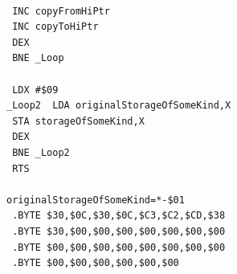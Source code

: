 \begin{minipage}[b]{0.33\linewidth}
\begin{lrbox}{\mybox}%
\begin{lstlisting}[basicstyle=\ttfamily\tiny]

 INC copyFromHiPtr
 INC copyToHiPtr
 DEX
 BNE _Loop

 LDX #$09
_Loop2  LDA originalStorageOfSomeKind,X
 STA storageOfSomeKind,X
 DEX
 BNE _Loop2
 RTS

originalStorageOfSomeKind=*-$01
 .BYTE $30,$0C,$30,$0C,$C3,$C2,$CD,$38
 .BYTE $30,$00,$00,$00,$00,$00,$00,$00
 .BYTE $00,$00,$00,$00,$00,$00,$00,$00
 .BYTE $00,$00,$00,$00,$00,$00

\end{lstlisting}
\end{lrbox}%
\scalebox{0.8}{\usebox{\mybox}}
\end{minipage}
